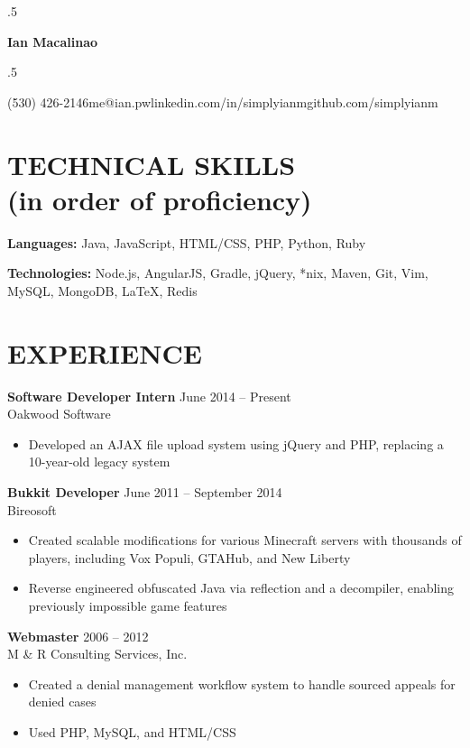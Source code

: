 \documentclass[margin, 10pt]{res} %
\makeatletter
\def\ULurl@#1{\hyper@linkurl{\ULurl@@{#1}}{#1}}
\DeclareRobustCommand*\ULurl{\hyper@normalise\ULurl@}
\newcommand*{\its}{\hspace{0.8cm}}
\makeatother
\begin{document}
\moveleft.5\hoffset\centerline{\Huge\bf Ian Macalinao}
\bigskip
\moveleft.5\hoffset\centerline{(530) 426-2146\its{}me@ian.pw\its{}\ULurl{http://ian.pw}\its{}linkedin.com/in/simplyianm\its{}github.com/simplyianm}

\begin{resume}

  \section{TECHNICAL SKILLS \\ \textnormal{(in order of proficiency)}} 

  {\bf Languages:} Java, JavaScript, HTML/CSS, PHP, Python, Ruby

  {\bf Technologies:} Node.js, AngularJS, Gradle, jQuery, *nix, Maven, Git, Vim, MySQL, MongoDB, \LaTeX, Redis

  \section{EXPERIENCE}

  {\bf Software Developer Intern} \hfill June 2014 -- Present \\
  Oakwood Software

  \begin{itemize} \itemsep -2pt
    \item Developed an AJAX file upload system using jQuery and PHP, replacing a 10-year-old legacy system
  \end{itemize}

  {\bf Bukkit Developer} \hfill June 2011 -- September 2014 \\
  Bireosoft

  \begin{itemize} \itemsep -2pt
    \item Created scalable modifications for various Minecraft servers with thousands of players, including Vox Populi, GTAHub, and New Liberty
    \item Reverse engineered obfuscated Java via reflection and a decompiler, enabling previously impossible game features
  \end{itemize}

  {\bf Webmaster} \hfill 2006 -- 2012 \\
  M \& R Consulting Services, Inc.
  \begin{itemize} \itemsep -2pt
    \item Created a denial management workflow system to handle sourced appeals for denied cases
    \item Used PHP, MySQL, and HTML/CSS
  \end{itemize} 


\end{resume}
\end{document}
